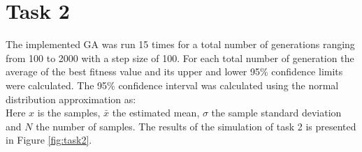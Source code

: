 \documentclass[]{article}
\begin{document}
\section*{Task 2}
The implemented GA was run 15 times for a total number of generations ranging from 100 to 2000 with a step size of 100. For each total number of generation the average of the best fitness value and its upper and lower 95\% confidence limits were calculated.
The 95\% confidence interval was calculated using the normal distribution approximation as:
\begin{equation*}
    [\bar{x} - 1.96\cdot\frac{\sigma}{\sqrt{N}}, \bar{x} + 1.96\cdot\frac{\sigma}{\sqrt{N}}]
  \end{equation*}
Here $x$ is the samples, $\bar{x}$ the estimated mean, $\sigma$ the sample standard deviation and $N$ the number of samples.
The results of the simulation of task 2 is presented in Figure \ref{fig:task2}.
\end{document}
